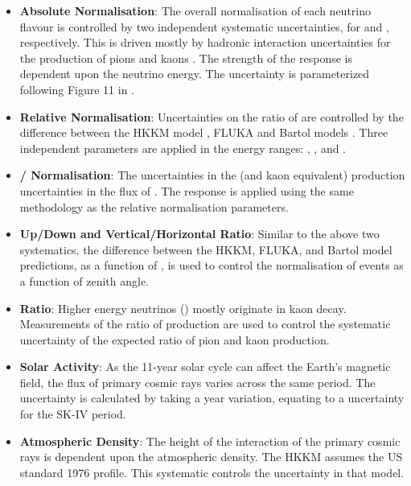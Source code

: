 \begin{itemize}
\item \textbf{Absolute Normalisation}: The overall normalisation of each neutrino flavour is controlled by two independent systematic uncertainties, for  and , respectively. This is driven mostly by hadronic interaction uncertainties for the production of pions and kaons \cite{Honda_2007}. The strength of the response is dependent upon the neutrino energy. The uncertainty is parameterized following Figure 11 in \cite{Honda_2007}.
\item \textbf{Relative Normalisation}: Uncertainties on the ratio of  are controlled by the difference between the HKKM model \cite{Honda_2007}, FLUKA \cite{etde_20239111} and Bartol models \cite{Barr_2004}. Three independent parameters are applied in the energy ranges: , , and .
\item \textbf{\quickmath{\nu}/\quickmath{\bar{\nu}} Normalisation}: The uncertainties in the \quickmath{\pi^{+}/\pi^{-}} (and kaon equivalent) production uncertainties in the flux of \quickmath{\nu/\bar{\nu}}. The response is applied using the same methodology as the relative normalisation parameters.
\item \textbf{Up/Down and Vertical/Horizontal Ratio}: Similar to the above two systematics, the difference between the HKKM, FLUKA, and Bartol model predictions, as a function of , is used to control the normalisation of events as a function of zenith angle.
\item{\textbf{ Ratio}}: Higher energy neutrinos () mostly originate in kaon decay. Measurements of the ratio of  production \cite{Ambrosini1998-er} are used to control the systematic uncertainty of the expected ratio of pion and kaon production.
\item \textbf{Solar Activity}: As the 11-year solar cycle can affect the Earth's magnetic field, the flux of primary cosmic rays varies across the same period. The uncertainty is calculated by taking a  year variation, equating to a  uncertainty for the SK-IV period.
\item \textbf{Atmospheric Density}: The height of the interaction of the primary cosmic rays is dependent upon the atmospheric density. The HKKM assumes the US standard 1976 \cite{USStandardAtm} profile. This systematic controls the uncertainty in that model.
\end{itemize}

